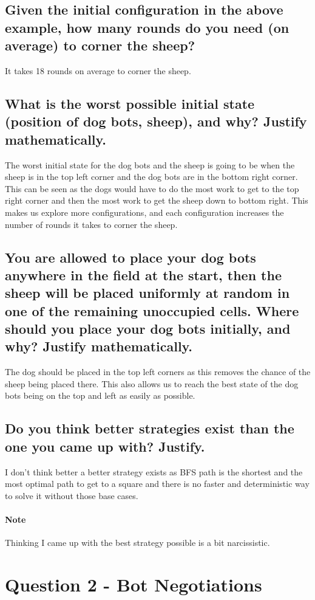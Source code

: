 \documentclass[11pt]{scrartcl} %
\begin{document}
\subsection{Given the initial configuration in the above example, how many rounds do you need (on average) to corner the sheep?}
It takes 18 rounds on average to corner the sheep. 
\subsection{What is the worst possible initial state (position of dog bots, sheep), and why? Justify mathematically.}
The worst initial state for the dog bots and the sheep is going to be when the sheep is in the top left corner and the dog bots are in the bottom right corner. This can be seen as the dogs would have to do the most work to get to the top right corner and then the most work to get the sheep down to bottom right. This makes us explore more configurations, and each configuration increases the number of rounds it takes to corner the sheep. 
\subsection{You are allowed to place your dog bots anywhere in the field at the start, then the sheep will be placed uniformly
at random in one of the remaining unoccupied cells. Where should you place your dog bots initially, and why?
Justify mathematically.}
The dog should be placed in the top left corners as this removes the chance of the sheep being placed there. This also allows us to reach the best state of the dog bots being on the top and left as easily as possible. 
\subsection{Do you think better strategies exist than the one you came up with? Justify.}
I don't think better a better strategy exists as BFS path is the shortest and the most optimal path to get to a square and there is no faster and deterministic way to solve it without those base cases. \\
\paragraph{Note}
Thinking I came up with the best strategy possible is a bit narcissistic. 
\section{Question 2 - Bot Negotiations}
\end{document}

